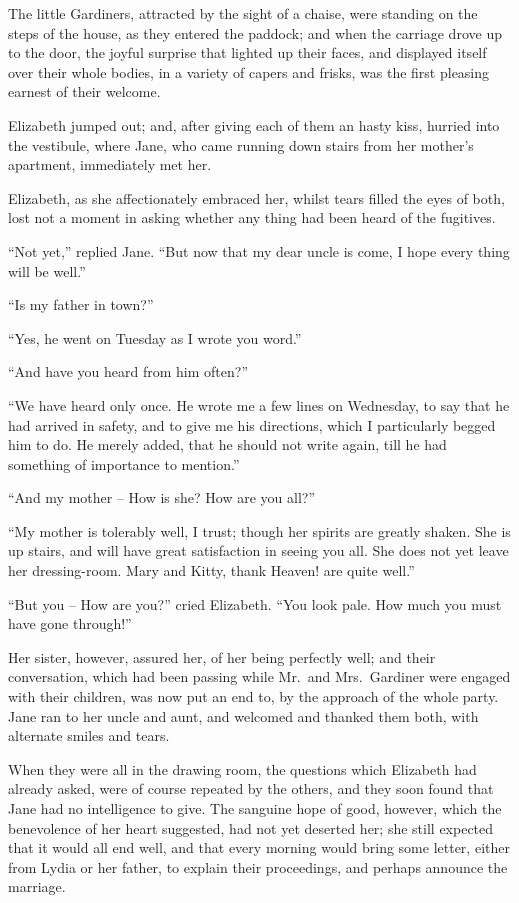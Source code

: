 The little Gardiners, attracted by the sight of a chaise,
were standing on the steps of the house, as they entered
the paddock; and when the carriage drove up to the door,
the joyful surprise that lighted up their faces, and displayed
itself over their whole bodies, in a variety of capers
and frisks, was the first pleasing earnest of their welcome.

Elizabeth jumped out; and, after giving each of them
an hasty kiss, hurried into the vestibule, where Jane, who
came running down stairs from her mother’s apartment,
immediately met her.

Elizabeth, as she affectionately embraced her, whilst
tears filled the eyes of both, lost not a moment in asking
whether any thing had been heard of the fugitives.

“Not yet,” replied Jane. “But now that my dear
uncle is come, I hope every thing will be well.”

“Is my father in town?”

“Yes, he went on Tuesday as I wrote you word.”

“And have you heard from him often?”

“We have heard only once. He wrote me a few lines
on Wednesday, to say that he had arrived in safety, and
to give me his directions, which I particularly begged him
to do. He merely added, that he should not write again,
till he had something of importance to mention.”

“And my mother -- How is she? How are you all?”

“My mother is tolerably well, I trust; though her
spirits are greatly shaken. She is up stairs, and will have
great satisfaction in seeing you all. She does not yet
leave her dressing-room. Mary and Kitty, thank Heaven!
are quite well.”

“But you -- How are you?” cried Elizabeth. “You
look pale. How much you must have gone through!”

Her sister, however, assured her, of her being perfectly
well; and their conversation, which had been passing
while Mr.\ and Mrs.\ Gardiner were engaged with their
children, was now put an end to, by the approach of the
whole party. Jane ran to her uncle and aunt, and welcomed
and thanked them both, with alternate smiles and
tears.

When they were all in the drawing room, the questions
which Elizabeth had already asked, were of course
repeated by the others, and they soon found that Jane
had no intelligence to give. The sanguine hope of good,
however, which the benevolence of her heart suggested,
had not yet deserted her; she still expected that it would
all end well, and that every morning would bring some
letter, either from Lydia or her father, to explain their
proceedings, and perhaps announce the marriage.

